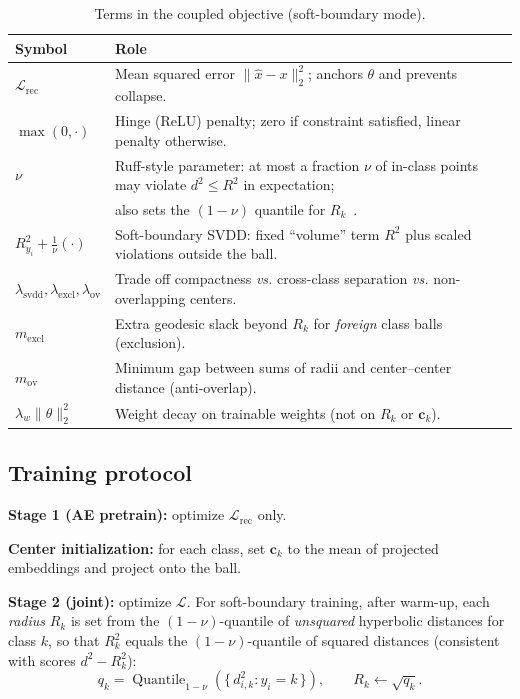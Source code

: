 \documentclass[conference]{IEEEtran}
\begin{document}
\begin{table}[t]
\centering
\caption{Terms in the coupled objective (soft-boundary mode).}
\label{tab:loss-glossary}
\begin{tabular}{@{}ll@{}}
\toprule
Symbol & Role \\
\midrule
$\mathcal{L}_{\text{rec}}$ & Mean squared error $\|\hat x-x\|_2^2$; anchors $\theta$ and prevents collapse. \\
$\max(0,\cdot)$ & Hinge (ReLU) penalty; zero if constraint satisfied, linear penalty otherwise. \\
$\nu$ & Ruff-style parameter: at most a fraction $\nu$ of in-class points may violate $d^2{\leq}R^2$ in expectation; \\
& also sets the $(1{-}\nu)$ quantile for $R_k$~\cite{ruff2018deep}. \\
$R_{y_i}^2{+}\frac1\nu(\cdot)$ & Soft-boundary SVDD: fixed ``volume'' term $R^2$ plus scaled violations outside the ball. \\
$\lambda_{\text{svdd}},\lambda_{\text{excl}},\lambda_{\text{ov}}$ & Trade off compactness \emph{vs.} cross-class separation \emph{vs.} non-overlapping centers. \\
$m_{\text{excl}}$ & Extra geodesic slack beyond $R_k$ for \emph{foreign} class balls (exclusion). \\
$m_{\text{ov}}$ & Minimum gap between sums of radii and center--center distance (anti-overlap). \\
$\lambda_w\|\theta\|_2^2$ & Weight decay on trainable weights (not on $R_k$ or $\mathbf{c}_k$). \\
\bottomrule
\end{tabular}
\end{table}

\subsection{Training protocol}\label{sec:training}
\textbf{Stage 1 (AE pretrain):} optimize $\mathcal{L}_{\text{rec}}$ only.

\textbf{Center initialization:} for each class, set $\mathbf{c}_k$ to the mean of projected embeddings and project onto the ball.

\textbf{Stage 2 (joint):} optimize $\mathcal{L}$.
For soft-boundary training, after warm-up, each \emph{radius} $R_k$ is set from the $(1-\nu)$-quantile of \emph{unsquared} hyperbolic distances for class $k$, so that $R_k^2$ equals the $(1-\nu)$-quantile of squared distances (consistent with scores $d^2-R_k^2$):
\begin{equation}
q_k = \operatorname{Quantile}_{1-\nu}\!\left(\bigl\{\, d_{i,k}^2 : y_i=k \,\bigr\}\right),
\qquad
R_k \leftarrow \sqrt{q_k}.
\label{eq:radius-update}
\end{equation}
\end{document}

